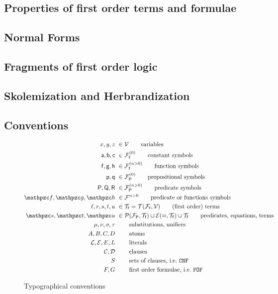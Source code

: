 \subsection{Properties of first order terms and formulae}



\subsection{Normal Forms}



\subsection{Fragments of first order logic}



\subsection{Skolemization and Herbrandization}


\subsection{Conventions}

\begin{figure}[hbt]
	\begin{align*}
	x,y,z &\ \in\mcV \tag*{variables} \\
	\ma,\mb,\mc &\ \in\mcFfn[{0}]\tag*{constant symbols} \\
	\mf, \mg, \mh &\ \in\mcFfn[{n>0}]\tag*{function symbols} \\
	\mpp, \mpq&\ \in\mcFPn[{0}]\tag*{propositional symbols}\\
	\mP, \mQ, \mR &\ \in\mcFPn[{n>0}]\tag*{predicate symbols}\\
	\mcf, \mcg, \mch &\ \in\mcF^{n>0} \tag*{predicate or functions symbols}\\
	\ell, r, s,t,u &\ \in\mcTf = \mcTFfV\tag*{(first order) terms}\\
	\mcs, \mct, \mcu &\ \in \mcPT \cup \mcET \cup \mcTf \tag*{predicates, equations, terms}\\
	\mu, \nu, \sigma, \tau &\ \tag*{substitutions, unifiers}\\
	A,B,C,D &\ \tag*{atoms} \\
	\mcL, \mcE, E, L &\ \tag*{literals} \\
	\mcC, \mcD &\ \tag*{clauses} \\
	S &\ \tag*{sets of clauses, i.e.~\CNF}\\
	F, G &\ \tag*{first order formulae, i.e.~\FOF}
	\end{align*}
	\caption{Typographical conventions}
	\label{fig:conventions}
\end{figure}












